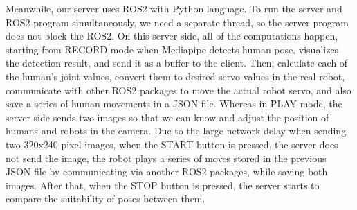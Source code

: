 

Meanwhile, our server uses ROS2 with Python language. To run the server and ROS2 program simultaneously, we need a separate thread, so the server program does not block the ROS2.
On this server side, all of the computations happen, starting from RECORD mode when Mediapipe detects human pose, visualizes the detection result, and send it as a buffer to the client.
Then, calculate each of the human's joint values, convert them to desired servo values in the real robot, communicate with other ROS2 packages to move the actual robot servo, and also save a series of human movements in a JSON file.
Whereas in PLAY mode, the server side sends two images so that we can know and adjust the position of humans and robots in the camera. Due to the large network delay when sending two 320x240 pixel images, when the START button is pressed,
the server does not send the image, the robot plays a series of moves stored in the previous JSON file by communicating via another ROS2 packages, while saving both images. After that, when the STOP button is pressed, the server starts to compare the suitability of poses between them.